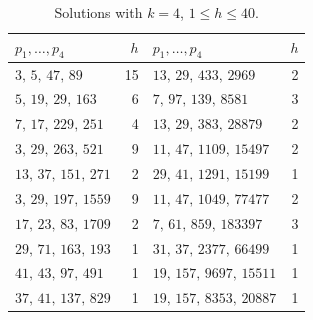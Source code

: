 \documentclass[11pt,reqno]{amsart}
\numberwithin{equation}{section}
\theoremstyle{plain}
\theoremstyle{definition}
\theoremstyle{remark}
\begin{document}
\begin{table}[ht]
\centering
\caption{Solutions with $k=4$, $1\le h\le40$.}
\label{tab:S4}
\smallskip
\footnotesize
\begin{tabular}{@{}lr@{\qquad}lr@{}}
\toprule
$p_1,\dots,p_4$ & $h$ & $p_1,\dots,p_4$ & $h$ \\
\midrule
$3,\,5,\,47,\,89$ & 15 & $13,\,29,\,433,\,2969$ & 2 \\
$5,\,19,\,29,\,163$ & 6 & $7,\,97,\,139,\,8581$ & 3 \\
$7,\,17,\,229,\,251$ & 4 & $13,\,29,\,383,\,28879$ & 2 \\
$3,\,29,\,263,\,521$ & 9 & $11,\,47,\,1109,\,15497$ & 2 \\
$13,\,37,\,151,\,271$ & 2 & $29,\,41,\,1291,\,15199$ & 1 \\
$3,\,29,\,197,\,1559$ & 9 & $11,\,47,\,1049,\,77477$ & 2 \\
$17,\,23,\,83,\,1709$ & 2 & $7,\,61,\,859,\,183397$ & 3 \\
$29,\,71,\,163,\,193$ & 1 & $31,\,37,\,2377,\,66499$ & 1 \\
$41,\,43,\,97,\,491$ & 1 & $19,\,157,\,9697,\,15511$ & 1 \\
$37,\,41,\,137,\,829$ & 1 & $19,\,157,\,8353,\,20887$ & 1 \\
\bottomrule
\end{tabular}
\end{table}
\end{document}
